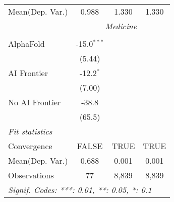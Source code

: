 \begin{tabular}{lccc}
Mean(Dep. Var.) & 0.988 & 1.330 & 1.330 \\
 & \multicolumn{3}{c}{\textit{Medicine}} \\ \\
   AlphaFold      & -15.0$^{***}$ &       &   \\   
                  & (5.44)        &       &   \\   
   AI Frontier    & -12.2$^{*}$   &       &   \\   
                  & (7.00)        &       &   \\   
   No AI Frontier & -38.8         &       &   \\   
                  & (65.5)        &       &   \\   
   \midrule
   \emph{Fit statistics}\\
   Convergence    &FALSE          & TRUE  & TRUE\\  
Mean(Dep. Var.) & 0.688 & 0.001 & 0.001 \\
   Observations   & 77            & 8,839 & 8,839\\  
   \midrule \midrule
   \multicolumn{4}{l}{\emph{Signif. Codes: ***: 0.01, **: 0.05, *: 0.1}}\\
\end{tabular}
\par\endgroup
